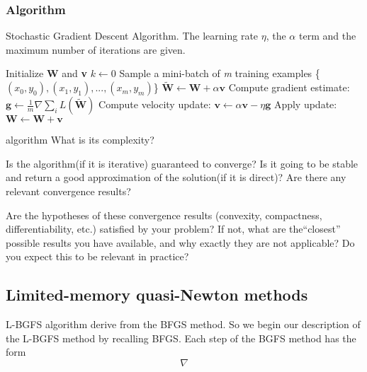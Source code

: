 \subsubsection{Algorithm}
\begin{algorithm}[H]
	\caption{Stochastic Gradient Descent Algorithm. The learning rate $\eta$, the $\alpha$ term and the maximum number of iterations are given.}
	\label{alg:sgd}
	\begin{algorithmic}[1]
		\State Initialize \textbf{W} and \textbf{v}
		\State $k \gets 0$
		\State Sample a mini-batch of \textit{m} training examples \{\textit{$(x_0,y_0),(x_1,y_1),...,(x_m,y_m)$}\}
		\State $\tilde{\textbf{W}} \gets \textbf{W} + \alpha \textbf{v}$
		\EndIf
		\State Compute gradient estimate: $\textbf{g} \gets \frac {1}{m} \nabla \sum_i\textit{L}(\tilde{\textbf{W}})$
		\State Compute velocity update: $\textbf{v} \gets \alpha \textbf{v} - \eta \textbf{g}$
		\State Apply update: $\textbf{W} \gets \textbf{W} + \textbf{v}$
		\EndWhile
		\EndProcedure
	\end{algorithmic}
\end{algorithm}



 algorithm What is its complexity?

Is the algorithm(if it is iterative) guaranteed to converge? Is it going to be stable and return a good approximation of the solution(if it is direct)?  Are there any relevant convergence results?

Are the hypotheses of these convergence results (convexity, compactness, differentiability, etc.) satisfied by your problem? If not, what are the“closest” possible results you have available, and why exactly they are not applicable?  Do you expect this to be relevant in practice?

\subsection{Limited-memory quasi-Newton methods}
L-BGFS algorithm derive from the BFGS method. So we begin our description of the L-BGFS method by recalling BFGS. 
Each step of the BGFS method has the form
\begin{equation}
\label{stepBFGS}
\nabla
\end{equation}

